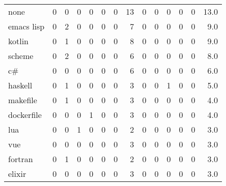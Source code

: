 \begin{tabular}{lrrrrrrrrrrrrr}
none             &        0 &       0 &          0 &               0 &                0 &       0 &         13 &         0 &         0 &      0 &             0 &         0 &     13.0 \\
emacs lisp       &        0 &       2 &          0 &               0 &                0 &       0 &          7 &         0 &         0 &      0 &             0 &         0 &      9.0 \\
kotlin           &        0 &       1 &          0 &               0 &                0 &       0 &          8 &         0 &         0 &      0 &             0 &         0 &      9.0 \\
scheme           &        0 &       2 &          0 &               0 &                0 &       0 &          6 &         0 &         0 &      0 &             0 &         0 &      8.0 \\
c\#               &        0 &       0 &          0 &               0 &                0 &       0 &          6 &         0 &         0 &      0 &             0 &         0 &      6.0 \\
haskell          &        0 &       1 &          0 &               0 &                0 &       0 &          3 &         0 &         0 &      1 &             0 &         0 &      5.0 \\
makefile         &        0 &       1 &          0 &               0 &                0 &       0 &          3 &         0 &         0 &      0 &             0 &         0 &      4.0 \\
dockerfile       &        0 &       0 &          0 &               1 &                0 &       0 &          3 &         0 &         0 &      0 &             0 &         0 &      4.0 \\
lua              &        0 &       0 &          1 &               0 &                0 &       0 &          2 &         0 &         0 &      0 &             0 &         0 &      3.0 \\
vue              &        0 &       0 &          0 &               0 &                0 &       0 &          3 &         0 &         0 &      0 &             0 &         0 &      3.0 \\
fortran          &        0 &       1 &          0 &               0 &                0 &       0 &          2 &         0 &         0 &      0 &             0 &         0 &      3.0 \\
elixir           &        0 &       0 &          0 &               0 &                0 &       0 &          3 &         0 &         0 &      0 &             0 &         0 &      3.0 \\

\end{tabular}
